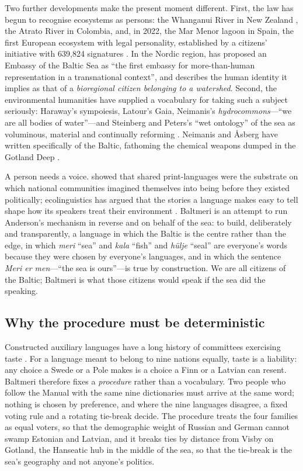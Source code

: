 Two further developments make the present moment different. First, the law has begun to recognise ecosystems as persons: the Whanganui River in New Zealand \citeyearpar{teawatupua2017}, the Atrato River in Colombia, and, in 2022, the Mar Menor lagoon in Spain, the first European ecosystem with legal personality, established by a citizens' initiative with 639,824 signatures \citep{spain2022,kauffman2021,stone1972}. In the Nordic region, \citet{thiel2024} has proposed an Embassy of the Baltic Sea as ``the first embassy for more-than-human representation in a transnational context'', and describes the human identity it implies as that of a \emph{bioregional citizen belonging to a watershed}. Second, the environmental humanities have supplied a vocabulary for taking such a subject seriously: Haraway's sympoiesis, Latour's Gaia, Neimanis's \emph{hydrocommons}---``we are all bodies of water''---and Steinberg and Peters's ``wet ontology'' of the sea as voluminous, material and continually reforming \citep{haraway2016,latour2017,neimanis2017,steinberg2015}. Neimanis and Åsberg have written specifically of the Baltic, fathoming the chemical weapons dumped in the Gotland Deep \citep{neimanis2017gotland}.

A person needs a voice. \citet{anderson2006} showed that shared print-languages were the substrate on which national communities imagined themselves into being before they existed politically; ecolinguistics has argued that the stories a language makes easy to tell shape how its speakers treat their environment \citep{haugen1972,fill2001,stibbe2021}. Baltmeri is an attempt to run Anderson's mechanism in reverse and on behalf of the sea: to build, deliberately and transparently, a language in which the Baltic is the centre rather than the edge, in which \emph{meri} ``sea'' and \emph{kala} ``fish'' and \emph{hülje} ``seal'' are everyone's words because they were chosen by everyone's languages, and in which the sentence \emph{Meri er men}---``the sea is ours''---is true by construction. We are all citizens of the Baltic; Baltmeri is what those citizens would speak if the sea did the speaking.

\subsection{Why the procedure must be deterministic}
Constructed auxiliary languages have a long history of committees exercising taste \citep{okrent2009,gobbo2020}. For a language meant to belong to nine nations equally, taste is a liability: any choice a Swede or a Pole makes is a choice a Finn or a Latvian can resent. Baltmeri therefore fixes a \emph{procedure} rather than a vocabulary. Two people who follow the Manual with the same nine dictionaries must arrive at the same word; nothing is chosen by preference, and where the nine languages disagree, a fixed voting rule and a rotating tie-break decide. The procedure treats the four families as equal voters, so that the demographic weight of Russian and German cannot swamp Estonian and Latvian, and it breaks ties by distance from Visby on Gotland, the Hanseatic hub in the middle of the sea, so that the tie-break is the sea's geography and not anyone's politics.

